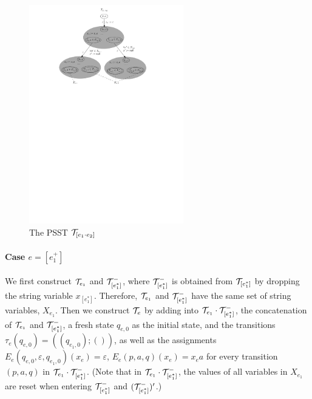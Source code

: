 \begin{figure}[ht]
	\centering
	\includegraphics[width = 0.6\textwidth]{reg2pfa-2.pdf}
	\caption{The PSST $\mathcal{T}_{[e_1\cdot e_2]}$}
	\label{fig-reg2pfa-2}
\end{figure}  

\paragraph{Case $e = [e_1^{+}]$}  We first construct $\mathcal{T}_{e_1}$ and $\mathcal{T}^-_{[e^\ast_1]}$, where $\mathcal{T}^-_{[e^\ast_1]}$ is obtained from $\mathcal{T}_{[e^\ast_1]}$ by dropping the string variable $x_{[e^\ast_1]}$. Therefore, $\mathcal{T}_{e_1}$ and $\mathcal{T}^-_{[e^\ast_1]}$ have the same set of string variables, $X_{e_1}$. Then we construct $\mathcal{T}_{e}$ by adding into $\mathcal{T}_{e_1} \cdot \mathcal{T}^-_{[e^\ast_1]}$, the concatenation of $\mathcal{T}_{e_1}$ and $\mathcal{T}^-_{[e^\ast_1]}$, a fresh state $q_{e,0}$ as the initial state, and the transitions $\tau_e(q_{e,0}) = ((q_{e_1,0});())$, as well as the assignments $E_e(q_{e,0}, \varepsilon, q_{e_1,0})(x_e) = \varepsilon$, $E_e(p, a, q)(x_e) = x_e a$ for every transition $(p, a, q)$ in $\mathcal{T}_{e_1} \cdot \mathcal{T}^-_{[e^\ast_1]}$. (Note that in $\mathcal{T}_{e_1} \cdot \mathcal{T}^-_{[e^\ast_1]}$, the values of all variables in $X_{e_1}$ are reset when entering $ \mathcal{T}^-_{[e^\ast_1]}$ and $(\mathcal{T}^-_{[e^\ast_1]})'$.)




